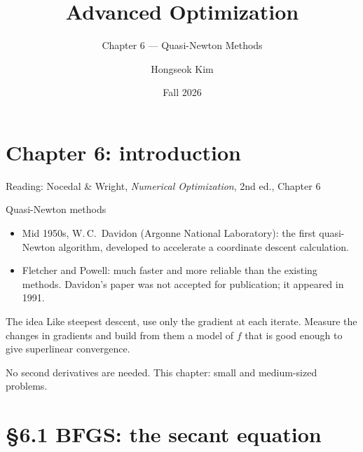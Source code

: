 \documentclass[aspectratio=169,12pt]{beamer}
\title{Advanced Optimization}
\subtitle{Chapter 6 --- Quasi-Newton Methods}
\author{Hongseok Kim}
\institute{Department of Electronic Engineering, Sogang University}
\date{Fall 2026}
\begin{document}
\section{Chapter 6: introduction}

\begin{frame}
  \titlepage
  \begin{center}\small
    Reading: Nocedal \& Wright, \emph{Numerical Optimization}, 2nd ed., Chapter 6
  \end{center}
\end{frame}

\begin{frame}{Quasi-Newton methods}
  \begin{itemize}\setlength\itemsep{0.5em}
    \item Mid 1950s, W.\,C.~Davidon (Argonne National Laboratory): the first
      quasi-Newton algorithm, developed to accelerate a coordinate descent calculation.
    \item Fletcher and Powell: much faster and more reliable than the existing methods.
      Davidon's paper was not accepted for publication; it appeared in 1991.
  \end{itemize}

  \vspace{0.3em}
  \begin{block}{The idea}
    Like steepest descent, use \alert{only the gradient} at each iterate. Measure the
    \alert{changes in gradients} and build from them a model of $f$ that is good enough to
    give \alert{superlinear convergence}.
  \end{block}

  \vspace{0.3em}
  No second derivatives are needed. This chapter: small and medium-sized problems.
\end{frame}

\section{\S6.1 BFGS: the secant equation}
\end{document}
